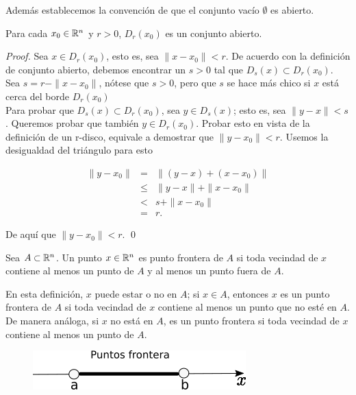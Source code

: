Además establecemos la convención de que el conjunto vac\'io $\emptyset$ es abierto.

\begin{theorem}
    Para cada $x_{0} \in \mathbb{R}^{n}$ y $r > 0$, $D_{r}(x_{0})$ es un conjunto abierto.
\end{theorem}

\begin{proof}
    Sea $x \in D_{r}(x_{0})$, esto es, sea $\|x - x_{0}\| < r$. De acuerdo con la definición
    de conjunto abierto, debemos encontrar un $s > 0$ tal que $D_{s}(x) \subset  D_{r}(x_{0})$.
    Sea $s = r - \|x - x_{0}\|$, nótese que $s > 0$, pero que $s$ se hace más chico si $x$ está
    cerca del borde $D_{r}(x_{0})$ \\

    Para probar que $D_{s}(x) \subset D_{r}(x_{0})$, sea $y \in D_{s}(x)$; esto es, sea
    $\|y - x\| < s$. Queremos probar que también $y \in D_{r}(x_{0})$. Probar esto en vista
    de la definición de un r-disco, equivale a demostrar que $\|y -x_{0}\| < r$. Usemos la desigualdad
    del triángulo para esto

    \begin{eqnarray*}
        \|y - x_{0}\| &=& \|(y - x) + (x - x_{0})\| \\
                              &\le& \|y - x\| + \|x - x_{0}\| \\
                              &<& s + \|x-x_{0}\| \\
                              &=& r \text{.}
    \end{eqnarray*}

    De aquí que $\|y - x_{0}\| < r$. \qed

\end{proof}

\begin{definition}
    Sea $A \subset \mathbb{R}^{n}$. Un punto $x \in \mathbb{R}^{n}$ es punto frontera de $A$ si toda vecindad de $x$ contiene al menos un punto de $A$ y al menos un punto fuera de $A$.
\end{definition}

En esta definición, $x$ puede estar o no en $A$; si $x \in A$, entonces $x$ es un punto frontera de $A$ si toda vecindad de $x$ contiene al menos un punto
que no esté en $A$. De manera análoga, si $x$ no está en $A$, es un punto frontera si toda vecindad de
$x$ contiene al menos un punto de $A$.

\begin{figure}[!ht]
  \begin{center}
      \includegraphics[width=0.5\linewidth]{gfx/puntos-frontera}
      \caption{}
      \label{fig:boat1}
  \end{center}
\end{figure}


